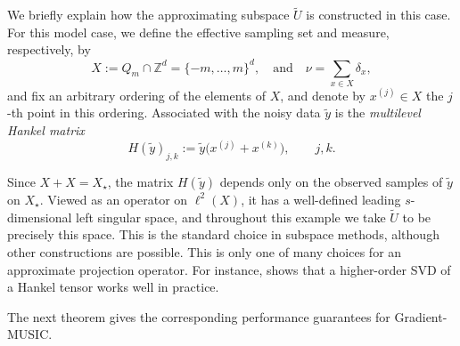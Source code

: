 \documentclass[11pt]{article}
\theoremstyle{definition}
\numberwithin{theorem}{section}
\numberwithin{lemma}{section}
\numberwithin{equation}{section}
\def\Z{\mathbb{Z}}
\renewcommand{\tilde}{\widetilde}
\newcommand{\sampset}{X}
\def\andspace{\quad\text{and}\quad}
\newcommand{\red}{\color{red}}
\numberwithin{equation}{section}
\begin{document}
We briefly explain how the approximating subspace $\tilde U$ is constructed in this case. 
 For this model case, we define the effective sampling set and measure, respectively, by
	$$
	\sampset :=Q_m\cap\Z^d
	= \{-m,\dots,m\}^d, \andspace
	\nu=\sum_{x\in \sampset} \delta_x, 
	$$
	and fix an arbitrary ordering of the elements of $X$, and denote by $x^{(j)}\in X$ the $j$-th point in this ordering. Associated with the noisy data $\tilde y$ is the \emph{multilevel Hankel matrix}
\[
H(\tilde y)_{j,k}:=\tilde y\bigl(x^{(j)}+x^{(k)}\bigr),
\qquad j,k.
\]

Since $X+X=\sampset_\star$, the matrix $H(\tilde y)$ depends only on the observed samples of $\tilde y$ on $\sampset_\star$. Viewed as an operator on $\ell^2(X)$, it has a well-defined leading $s$-dimensional left singular space, and throughout this example we take $\tilde U$ to be precisely this space. This is the standard choice in subspace methods, although other constructions are possible.
{This is only one of many choices for an approximate projection operator. For instance, \cite{haardt2008higher} shows that a higher-order SVD of a Hankel tensor works well in practice. }

The next theorem gives the corresponding performance guarantees for Gradient-MUSIC.
\end{document}

